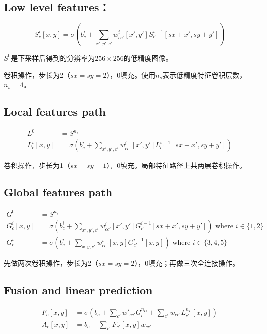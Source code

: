 \subsection{Low level features：}

\[S^i_{c}[x,y]=\sigma(b^i_{c}+\sum_{x',y',c'}w_{cc'}^i[x',y']S^{i-1}_{c'}[sx+x',sy+y'])\]

\(S^0\)是下采样后得到的分辨率为\(256\times 256\)的低精度图像。

卷积操作，步长为2（\(sx = sy = 2\)），0填充。使用\(n_s\)表示低精度特征卷积层数，\(n_s=4\)。

\subsection{Local features path}

$$
\begin{aligned}
L^0&=S^{n_s} \\
L^i_{c}[x,y]&=\sigma(b^i_{c}+\sum_{x',y',c'}w_{cc'}^i[x',y']L^{i-1}_{c'}[sx+x',sy+y'])
\end{aligned}
$$

卷积操作，步长为1（\(sx = sy = 1\)），0填充。局部特征路径上共两层卷积操作。

\subsection{Global features path}

$$
\begin{aligned}
G^0&=S^{n_s} \\
G^i_{c}[x,y]&=\sigma(b^i_{c}+\sum_{x',y',c'}w_{cc'}^i[x',y']G^{i-1}_{c'}[sx+x',sy+y'])\text{ where } i \in \lbrace 1, 2 \rbrace \\
G^i_{c}&=\sigma(b^i_c+\sum_{x,y,c'}w^i_{cc'}[x,y]G^{i-1}_{c'}[x,y])\text{ where } i \in \lbrace 3, 4, 5 \rbrace
\end{aligned}
$$

先做两次卷积操作，步长为2（\(sx = sy = 2\)），0填充；再做三次全连接操作。

\subsection{Fusion and linear prediction}

$$
\begin{aligned}
F_{c}[x,y]&=\sigma(b_c+\sum_{c'}w'_{cc'}G^{n_G}_{c'}+\sum_{c'}w_{cc'}L_{c'}^{n_L}[x,y]) \\
A_c[x,y]&= b_c+\sum_{c'}F_{c'}[x,y]w_{cc'}
\end{aligned}
$$

